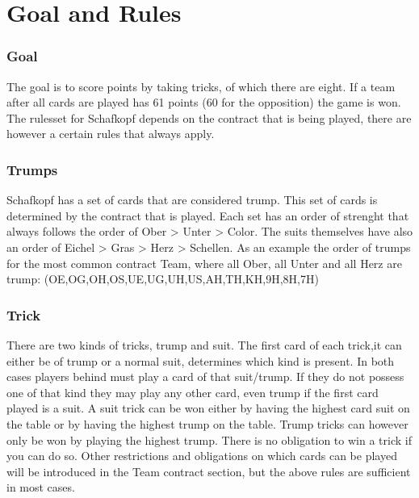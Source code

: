 \section{Goal and Rules}
\subsubsection{Goal}
The goal is to score points by taking tricks, of which there are eight.
If a team after all cards are played has 61 points (60 for the opposition) the game is won.
The rulesset for Schafkopf depends on the contract that is being played, there are however a certain rules that
always apply.
\subsubsection{Trumps}
Schafkopf has a set of cards that are considered trump.
This set of cards is determined by the contract that is played.
Each set has an order of strenght that always follows the order of Ober > Unter > Color.
The suits themselves have also an order of Eichel > Gras > Herz > Schellen.
As an example the order of trumps for the most common contract Team, where all Ober, all Unter and all Herz are trump:
(OE,OG,OH,OS,UE,UG,UH,US,AH,TH,KH,9H,8H,7H)
\subsubsection{Trick}
There are two kinds of tricks, trump and suit.
The first card of each trick,it can either be of trump or a normal suit, determines which kind is present.
In both cases players behind must play a card of that suit/trump.
If they do not possess one of that kind they may play any other card, even trump if the first card played is a suit.
\newline
A suit trick can be won either by having the highest card suit on the table or by having the highest trump on the table.
Trump tricks can however only be won by playing the highest trump.
There is no obligation to win a trick if you can do so.
Other restrictions and obligations on which cards can be played will be introduced in the Team contract section,
but the above rules are sufficient in most cases.
